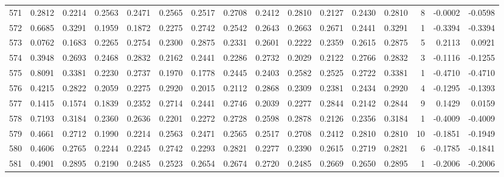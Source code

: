 \begin{tabular}{lrrrrrrrrrrrrrrr}
571 &      0.2812 &  0.2214 &  0.2563 &  0.2471 &  0.2565 &  0.2517 &  0.2708 &  0.2412 &  0.2810 &  0.2127 &   0.2430 &     0.2810 &      8 &                   -0.0002 &                    -0.0598 \\
572 &      0.6685 &  0.3291 &  0.1959 &  0.1872 &  0.2275 &  0.2742 &  0.2542 &  0.2643 &  0.2663 &  0.2671 &   0.2441 &     0.3291 &      1 &                   -0.3394 &                    -0.3394 \\
573 &      0.0762 &  0.1683 &  0.2265 &  0.2754 &  0.2300 &  0.2875 &  0.2331 &  0.2601 &  0.2222 &  0.2359 &   0.2615 &     0.2875 &      5 &                    0.2113 &                     0.0921 \\
574 &      0.3948 &  0.2693 &  0.2468 &  0.2832 &  0.2162 &  0.2441 &  0.2286 &  0.2732 &  0.2029 &  0.2122 &   0.2766 &     0.2832 &      3 &                   -0.1116 &                    -0.1255 \\
575 &      0.8091 &  0.3381 &  0.2230 &  0.2737 &  0.1970 &  0.1778 &  0.2445 &  0.2403 &  0.2582 &  0.2525 &   0.2722 &     0.3381 &      1 &                   -0.4710 &                    -0.4710 \\
576 &      0.4215 &  0.2822 &  0.2059 &  0.2275 &  0.2920 &  0.2015 &  0.2112 &  0.2868 &  0.2309 &  0.2381 &   0.2434 &     0.2920 &      4 &                   -0.1295 &                    -0.1393 \\
577 &      0.1415 &  0.1574 &  0.1839 &  0.2352 &  0.2714 &  0.2441 &  0.2746 &  0.2039 &  0.2277 &  0.2844 &   0.2142 &     0.2844 &      9 &                    0.1429 &                     0.0159 \\
578 &      0.7193 &  0.3184 &  0.2360 &  0.2636 &  0.2201 &  0.2272 &  0.2728 &  0.2598 &  0.2878 &  0.2126 &   0.2356 &     0.3184 &      1 &                   -0.4009 &                    -0.4009 \\
579 &      0.4661 &  0.2712 &  0.1990 &  0.2214 &  0.2563 &  0.2471 &  0.2565 &  0.2517 &  0.2708 &  0.2412 &   0.2810 &     0.2810 &     10 &                   -0.1851 &                    -0.1949 \\
580 &      0.4606 &  0.2765 &  0.2244 &  0.2245 &  0.2742 &  0.2293 &  0.2821 &  0.2277 &  0.2390 &  0.2615 &   0.2719 &     0.2821 &      6 &                   -0.1785 &                    -0.1841 \\
581 &      0.4901 &  0.2895 &  0.2190 &  0.2485 &  0.2523 &  0.2654 &  0.2674 &  0.2720 &  0.2485 &  0.2669 &   0.2650 &     0.2895 &      1 &                   -0.2006 &                    -0.2006 \\

\end{tabular}
